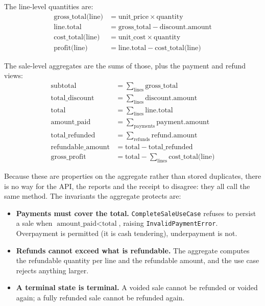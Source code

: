 \documentclass[11pt,a4paper]{article}
\begin{document}
The line-level quantities are:
\begin{align}
\text{gross\_total(line)} &= \text{unit\_price} \times \text{quantity} \\
\text{line.total} &= \text{gross\_total} - \text{discount.amount} \\
\text{cost\_total(line)} &= \text{unit\_cost} \times \text{quantity} \\
\text{profit(line)} &= \text{line.total} - \text{cost\_total(line)}
\end{align}

The sale-level aggregates are the sums of those, plus the payment and refund views:
\begin{align}
\text{subtotal} &= \sum_{\text{lines}} \text{gross\_total} \\
\text{total\_discount} &= \sum_{\text{lines}} \text{discount.amount} \\
\text{total} &= \sum_{\text{lines}} \text{line.total} \\
\text{amount\_paid} &= \sum_{\text{payments}} \text{payment.amount} \\
\text{total\_refunded} &= \sum_{\text{refunds}} \text{refund.amount} \\
\text{refundable\_amount} &= \text{total} - \text{total\_refunded} \\
\text{gross\_profit} &= \text{total} - \sum_{\text{lines}} \text{cost\_total(line)}
\end{align}

Because these are properties on the aggregate rather than stored duplicates, there is no way for the
API, the reports and the receipt to disagree: they all call the same method. The invariants the
aggregate protects are:

\begin{itemize}[leftmargin=1.4em]
  \item \textbf{Payments must cover the total.} \texttt{CompleteSaleUseCase} refuses to persist a
  sale when $\text{amount\_paid} < \text{total}$, raising \texttt{InvalidPaymentError}. Overpayment
  is permitted (it is cash tendering), underpayment is not.
  \item \textbf{Refunds cannot exceed what is refundable.} The aggregate computes the refundable
  quantity per line and the refundable amount, and the use case rejects anything larger.
  \item \textbf{A terminal state is terminal.} A voided sale cannot be refunded or voided again; a
  fully refunded sale cannot be refunded again.
\end{itemize}
\end{document}
